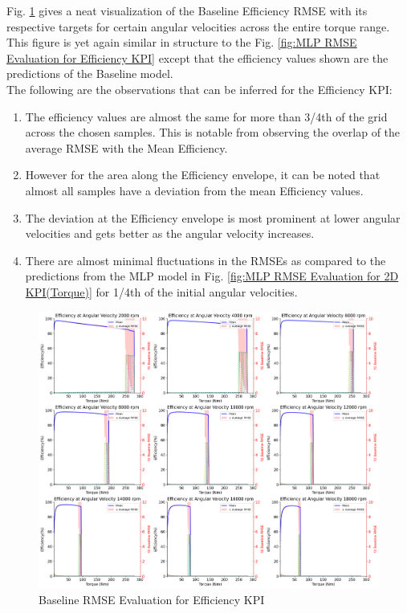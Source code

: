 \documentclass{report} %
\begin{document}
Fig. \ref{fig:Baseline RMSE Evaluation for Efficiency KPI} gives a neat visualization of the Baseline Efficiency \ac{RMSE} with its respective targets for certain angular velocities  
across the entire torque range. This figure is yet again similar in structure to the Fig. \ref{fig:MLP RMSE Evaluation for Efficiency KPI} except that the efficiency values 
shown are the predictions of the Baseline model. \\

The following are the observations that can be inferred for the Efficiency \ac{KPI}:
\begin{enumerate}[nosep]
    \item The efficiency values are almost the same for more than 3/4th of the grid across the chosen samples. This is notable from observing the overlap of the 
    average \ac{RMSE} with the Mean Efficiency.
    \item However for the area along the Efficiency envelope, it can be noted that almost all samples have a deviation from the mean Efficiency values.
    \item The deviation at the Efficiency envelope is most prominent at lower angular velocities and gets better as the angular velocity increases.
    \item There are almost minimal fluctuations in the \ac{RMSE}s as compared to the predictions from the \ac{MLP} model in 
    Fig. \ref{fig:MLP RMSE Evaluation for 2D KPI(Torque)} for 1/4th of the initial angular velocities.
\end{enumerate}

\begin{figure}[H]
    \centering
    \includegraphics[width=1\textwidth]{./ReportImages/rmse_eta_Baseline.png} 
    \caption{Baseline \ac{RMSE} Evaluation for Efficiency \ac{KPI}} 
    \label{fig:Baseline RMSE Evaluation for Efficiency KPI}
\end{figure}
\end{document}
